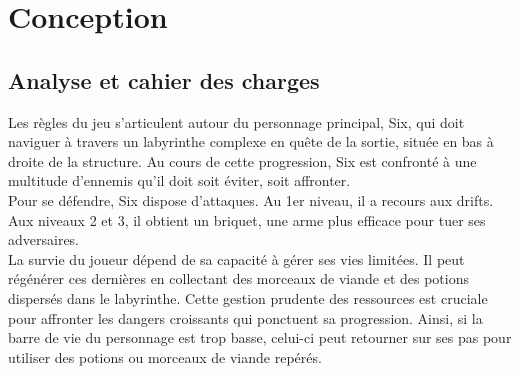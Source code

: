 \documentclass[10pt]{article}
\begin{document}
\section{Conception}
\subsection{Analyse et cahier des charges}
Les règles du jeu s'articulent autour du personnage principal, Six, qui doit naviguer à travers un labyrinthe complexe en quête de la sortie, située en bas à droite de la structure. Au cours de cette progression, Six est confronté à une multitude d'\gls{ennemis} qu'il doit soit éviter, soit affronter.\\

Pour se défendre, Six dispose d'attaques. Au 1er niveau, il a recours aux \gls{drifts}. Aux niveaux 2 et 3, il obtient un \gls{briquet}, une arme plus efficace pour tuer ses adversaires.\\

La survie du joueur dépend de sa capacité à gérer ses vies limitées. Il peut régénérer ces dernières en collectant des morceaux de viande et des potions dispersés dans le labyrinthe. Cette gestion prudente des ressources est cruciale pour affronter les dangers croissants qui ponctuent sa progression. Ainsi, si la barre de vie du personnage est trop basse, celui-ci peut retourner sur ses pas pour utiliser des potions ou morceaux de viande repérés.\\
\end{document}

